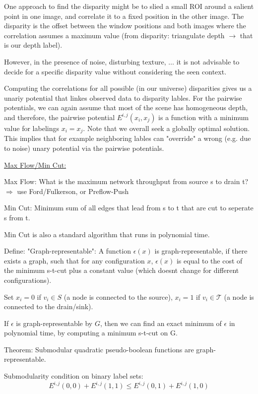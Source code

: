 \documentclass{scrartcl}
\begin{document}
One approach to find the disparity might be to slied a small ROI around a salient point in one image, and correlate it to a fixed position in the other image. The disparity is the offset between the window positions and both images where the correlation assumes a maximum value (from disparity: triangulate depth \(\rightarrow\) that is our depth label).

However, in the presence of noise, disturbing texture, \(\dots\) it is not advisable to decide for a specific disparity value without considering the seen context.

Computing the correlations for all possible (in our universe) disparities gives us a unariy potential that linkes observed data to disparity lables. For the pairwise potentials, we can again assume that most of the scene has homogeneous depth, and therefore, the pairwise potential \(E^{i,j} (x_i, x_j)\) is a function with a minimum value for labelings \(x_i = x_j\). Note that we overall seek a globally optimal solution. This implies that for example neighboring lables can "override" a wrong (e.g. due to noise) unary potential via the pairwise potentials.

\bigbreak

\underline{Max Flow/Min Cut:}

Max Flow: What is the maximum network throughput from source s to drain t? \(\Rightarrow\) use Ford/Fulkerson, or Preflow-Push

Min Cut: Minimum sum of all edges that lead from s to t that are cut to seperate s from t.

Min Cut is also a standard algorithm that runs in polynomial time.


Define: "Graph-representable": A function \(\epsilon (x)\) is graph-representable, if there exists a graph, such that for any configuration \(x\), \(\epsilon(x)\) is equal to the cost of the minimum s-t-cut plus a constant value (which doesnt change for different configurations).

Set \(x_i = 0\) if \(v_i \in S\) (a node is connected to the source), \(x_i=1\) if \(v_i \in \mathcal{T}\) (a node is connected to the drain/sink).

If \(\epsilon\) is graph-representable by \(G\), then we can find an exact minimum of \(\epsilon\) in polynomial time, by computing a minimum s-t-cut on G.

Theorem: Submodular quadratic pseudo-boolean functions are graph-representable.

Submodularity condition on binary label sets: 
\[E^{i,j} (0, 0) + E^{i,j}(1,1) \leq E^{i,j} (0,1) + E^{i,j} (1,0)\]
\end{document}
